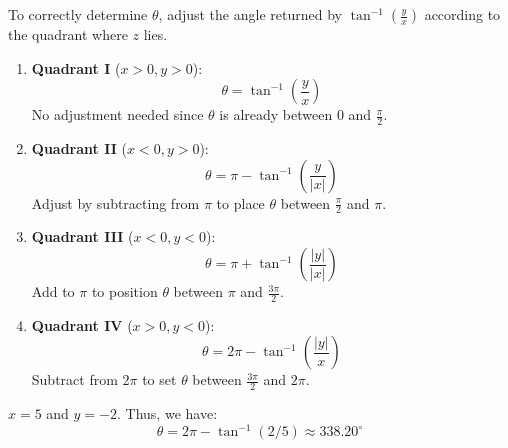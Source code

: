 \documentclass[a4paper,12pt]{article} %
\theoremstyle{definition}
\theoremstyle{plain}
\begin{document}
To correctly determine \( \theta \), adjust the angle returned by \(\tan^{-1}\left(\frac{y}{x}\right)\) according to the quadrant where \( z \) lies.

\begin{enumerate}
  \item \textbf{Quadrant I} (\( x > 0, y > 0 \)):
        \[
          \theta = \tan^{-1}\left(\frac{y}{x}\right)
        \]
        No adjustment needed since \( \theta \) is already between \( 0 \) and \( \frac{\pi}{2} \).

  \item \textbf{Quadrant II} (\( x < 0, y > 0 \)):
        \[
          \theta = \pi - \tan^{-1}\left(\frac{y}{|x|}\right)
        \]
        Adjust by subtracting from \( \pi \) to place \( \theta \) between \( \frac{\pi}{2} \) and \( \pi \).

  \item \textbf{Quadrant III} (\( x < 0, y < 0 \)):
        \[
          \theta = \pi + \tan^{-1}\left(\frac{|y|}{|x|}\right)
        \]
        Add to \( \pi \) to position \( \theta \) between \( \pi \) and \( \frac{3\pi}{2} \).

  \item \textbf{Quadrant IV} (\( x > 0, y < 0 \)):
        \[
          \theta = 2\pi - \tan^{-1}\left(\frac{|y|}{x}\right)
        \]
        Subtract from \( 2\pi \) to set \( \theta \) between \( \frac{3\pi}{2} \) and \( 2\pi \).
\end{enumerate}

\begin{examplebox}[Let $z = 5 - 2i$]
  $x = 5$ and $y = -2$. Thus, we have:
  $$\theta = 2\pi - \tan^{-1}({2/5}) \approx 338.20^\circ$$
  \begin{center}
  \end{center}

\end{examplebox}
\end{document}
